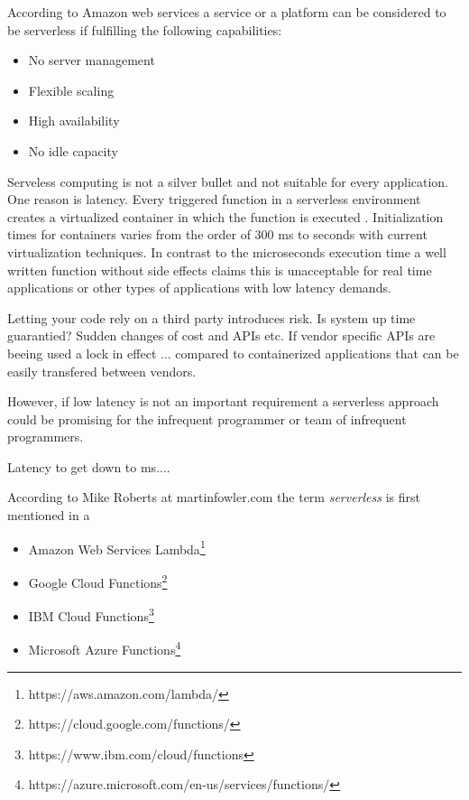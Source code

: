 \documentclass[a4paper,12pt]{article} %
\begin{document}
According to Amazon web services a service or a platform can be considered to be serverless if fulfilling the following capabilities\cite{Vogels2016}:
\begin{itemize}
\item No server management
\item Flexible scaling
\item High availability
\item No idle capacity
\end{itemize}



Serveless computing is not a silver bullet and not suitable for every application. One reason is latency. Every triggered function in a serverless environment creates a virtualized container in which the function is executed \cite{NeilSavage2018}. Initialization times for containers varies from the order of 300 ms to seconds \cite{} with current virtualization techniques. In contrast to the microseconds execution time a well written function without side effects claims this is unacceptable for real time applications or other types of applications with low latency demands. 

Letting your code rely on a third party introduces risk. Is system up time guarantied? Sudden changes of cost and APIs etc. \cite{MikeRoberts2016}
If vendor specific APIs are beeing used a lock in effect ... compared to containerized applications that can be easily transfered between vendors.\cite{} 


However, if low latency is not an important requirement a serverless approach could be promising for the infrequent programmer or team of infrequent programmers. 

Latency to get down to ms....



According to Mike Roberts at martinfowler.com\cite{MikeRoberts2016} the term \textit{serverless} is first mentioned in a\cite{Fromm2012}




\begin{itemize}
\item Amazon Web Services Lambda\footnote{https://aws.amazon.com/lambda/}
\item Google Cloud Functions\footnote{https://cloud.google.com/functions/}
\item IBM Cloud Functions\footnote{https://www.ibm.com/cloud/functions} 
\item Microsoft Azure Functions\footnote{https://azure.microsoft.com/en-us/services/functions/}
\end{itemize}
\end{document}

